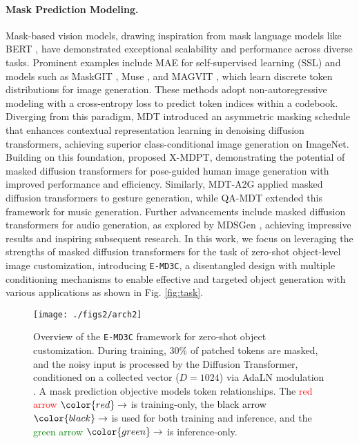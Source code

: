 \paragraph{Mask Prediction Modeling.}
Mask-based vision models, drawing inspiration from mask language models like BERT \cite{devlin2018bert}, have demonstrated exceptional scalability and performance across diverse tasks. Prominent examples include MAE \cite{he2022masked} for self-supervised learning (SSL) and models such as MaskGIT \cite{chang2022maskgit}, Muse \cite{chang2023muse}, and MAGVIT \cite{yu2023magvit}, which learn discrete token distributions for image generation. These methods adopt non-autoregressive modeling with a cross-entropy loss to predict token indices within a codebook. Diverging from this paradigm, MDT \cite{gao2023masked} introduced an asymmetric masking schedule that enhances contextual representation learning in denoising diffusion transformers, achieving superior class-conditional image generation on ImageNet. Building on this foundation, \citet{phamcross} proposed X-MDPT, demonstrating the potential of masked diffusion transformers for pose-guided human image generation with improved performance and efficiency. Similarly, MDT-A2G \citep{mao2024mdt} applied masked diffusion transformers to gesture generation, while QA-MDT \citep{li2024quality} extended this framework for music generation. Further advancements include masked diffusion transformers for audio generation, as explored by MDSGen \cite{pham2025mdsgen}, achieving impressive results and inspiring subsequent research. In this work, we focus on leveraging the strengths of masked diffusion transformers \cite{gao2023masked} for the task of zero-shot object-level image customization, introducing \texttt{E-MD3C}, a disentangled design with multiple conditioning mechanisms to enable effective and targeted object generation with various applications as shown in Fig. \ref{fig:task}. 

\begin{figure*}%
  \centering
  \texttt{[image: ./figs2/arch2]}
  \vspace{-8pt}
  \caption{Overview of the \texttt{E-MD3C} framework for zero-shot object customization. During training, 30\% of patched tokens are masked, and the noisy input is processed by the Diffusion Transformer, conditioned on a collected vector ($D=1024$) via AdaLN modulation \cite{peebles2023scalable}. A mask prediction objective models token relationships. The \textcolor{red}{red arrow} $\color{red}\rightarrow$ is training-only, the \textcolor{black}{black arrow} $\color{black}\rightarrow$ is used for both training and inference, and the \textcolor{green}{green arrow} $\color{green}\rightarrow$ is inference-only.}
  \label{fig:arch}
  \vspace{-12pt}
\end{figure*}